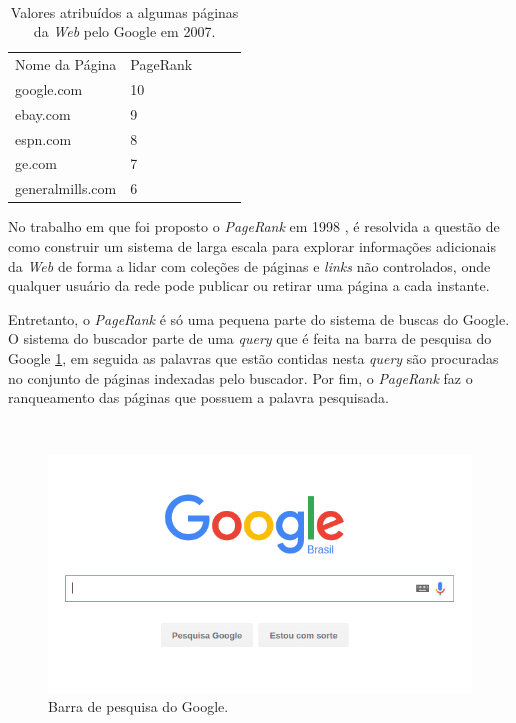 \vspace{0.3cm}

\
\begin{table}[!htb]
\centering
\begin{tabular}{lllll}
Nome da Página & PageRank\\
google.com & 10\\
ebay.com & 9\\
espn.com & 8\\
ge.com & 7\\
generalmills.com & 6\\
\end{tabular}
\caption{Valores atribuídos a algumas páginas da \textit{Web} pelo Google em 2007.}
\label{webrank}
\end{table}

No trabalho em que foi proposto o \textit{PageRank} em 1998 \cite{brin2012reprint}, é resolvida a questão de como construir um sistema de larga escala para explorar informações adicionais da \textit{Web} de forma a lidar com coleções de páginas e \textit{links} não controlados, onde qualquer usuário da rede pode publicar ou retirar uma página a cada instante. 

Entretanto, o \textit{PageRank} é só uma pequena parte do sistema de buscas do Google. O sistema do buscador parte de uma \textit{query} que é feita na barra de pesquisa do Google \ref{google}, em seguida as palavras que estão contidas nesta \textit{query} são procuradas no conjunto de páginas indexadas pelo buscador. Por fim, o \textit{PageRank} faz o ranqueamento das páginas que possuem a palavra pesquisada.

\
\begin{figure}[!htb]
	\centering
	\includegraphics[scale=0.45]{imagens/google}
	\caption{Barra de pesquisa do Google.}
	\label{google}
\end{figure}

